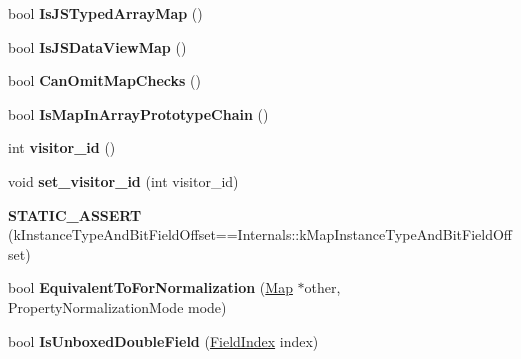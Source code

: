 \begin{DoxyCompactItemize}
\item 
bool {\bfseries Is\+J\+S\+Typed\+Array\+Map} ()\hypertarget{classv8_1_1internal_1_1_map_a84cfaa00232d1e6cfbe2ea1ca21e7d20}{}\label{classv8_1_1internal_1_1_map_a84cfaa00232d1e6cfbe2ea1ca21e7d20}

\item 
bool {\bfseries Is\+J\+S\+Data\+View\+Map} ()\hypertarget{classv8_1_1internal_1_1_map_afb3df3989d1bfc6c7fd27f0ad8c9cc39}{}\label{classv8_1_1internal_1_1_map_afb3df3989d1bfc6c7fd27f0ad8c9cc39}

\item 
bool {\bfseries Can\+Omit\+Map\+Checks} ()\hypertarget{classv8_1_1internal_1_1_map_ad129229a777f330e465f827f433a204d}{}\label{classv8_1_1internal_1_1_map_ad129229a777f330e465f827f433a204d}

\item 
bool {\bfseries Is\+Map\+In\+Array\+Prototype\+Chain} ()\hypertarget{classv8_1_1internal_1_1_map_a56ada393f6ae466b85ac554cc3eadcc4}{}\label{classv8_1_1internal_1_1_map_a56ada393f6ae466b85ac554cc3eadcc4}

\item 
int {\bfseries visitor\+\_\+id} ()\hypertarget{classv8_1_1internal_1_1_map_adc5ee962dbfb2b1f9acaf23c92531125}{}\label{classv8_1_1internal_1_1_map_adc5ee962dbfb2b1f9acaf23c92531125}

\item 
void {\bfseries set\+\_\+visitor\+\_\+id} (int visitor\+\_\+id)\hypertarget{classv8_1_1internal_1_1_map_ac7a8ebde9be73a459f9133c1ed540927}{}\label{classv8_1_1internal_1_1_map_ac7a8ebde9be73a459f9133c1ed540927}

\item 
{\bfseries S\+T\+A\+T\+I\+C\+\_\+\+A\+S\+S\+E\+RT} (k\+Instance\+Type\+And\+Bit\+Field\+Offset==Internals\+::k\+Map\+Instance\+Type\+And\+Bit\+Field\+Offset)\hypertarget{classv8_1_1internal_1_1_map_ad2c3c32a1fbd49a67e70ead082da7833}{}\label{classv8_1_1internal_1_1_map_ad2c3c32a1fbd49a67e70ead082da7833}

\item 
bool {\bfseries Equivalent\+To\+For\+Normalization} (\hyperlink{classv8_1_1internal_1_1_map}{Map} $\ast$other, Property\+Normalization\+Mode mode)\hypertarget{classv8_1_1internal_1_1_map_a5f98e94373829b71a17719889fe12a48}{}\label{classv8_1_1internal_1_1_map_a5f98e94373829b71a17719889fe12a48}

\item 
bool {\bfseries Is\+Unboxed\+Double\+Field} (\hyperlink{classv8_1_1internal_1_1_field_index}{Field\+Index} index)\hypertarget{classv8_1_1internal_1_1_map_a5c71c118c2ff57de02131752f35e5f17}{}\label{classv8_1_1internal_1_1_map_a5c71c118c2ff57de02131752f35e5f17}

\end{DoxyCompactItemize}

